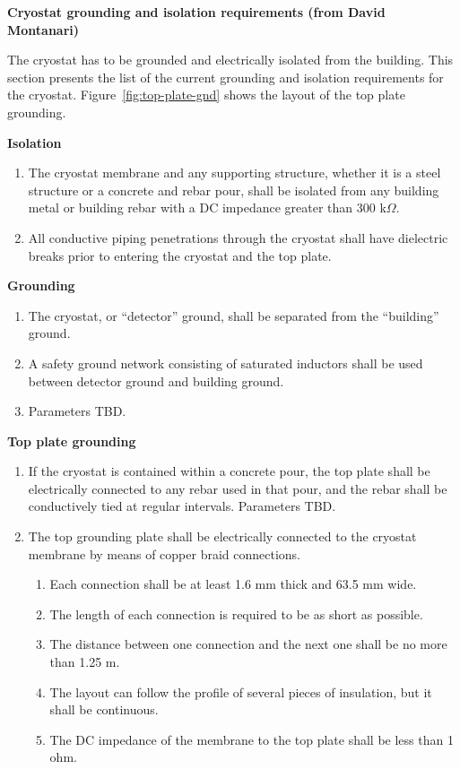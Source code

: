 \textbf{Cryostat grounding and isolation requirements (from David Montanari)}

The cryostat has to be grounded and electrically isolated from the building. %
This section presents the list of the current grounding and isolation requirements for the cryostat. 
Figure~\ref{fig:top-plate-gnd} shows the layout of the top plate grounding.

\textbf{Isolation}
\begin{enumerate}
\item The cryostat membrane and any supporting structure, whether it is a steel structure or a concrete and rebar pour, shall be isolated from any building metal or building rebar with a DC impedance greater than 300 k$\Omega$.
\item All conductive piping penetrations through the cryostat shall have dielectric breaks prior to entering the cryostat and the top plate.
\end{enumerate}

\textbf{Grounding}
\begin{enumerate}
\item The cryostat, or ``detector'' ground, shall be separated from the ``building'' ground.
\item A safety ground network consisting of saturated inductors shall be used between detector ground and building ground.
\item Parameters TBD.
\end{enumerate}

\textbf{Top plate grounding}
\begin{enumerate}
\item If the cryostat is contained within a concrete pour, the top plate shall be electrically connected to any rebar used in that pour, and the rebar shall be conductively tied at regular intervals. Parameters TBD.
\item The top grounding plate shall be electrically connected to the cryostat membrane by means of copper braid connections.
   \begin{enumerate}
   \item Each connection shall be at least 1.6 mm thick and 63.5 mm wide.
   \item The length of each connection is required to be as short as possible.
   \item The distance between one connection and the next one shall be no more than 1.25 m.
   \item The layout can follow the profile of several pieces of insulation, but it shall be continuous.
   \item The DC impedance of the membrane to the top plate shall be less than 1 ohm.
   \end{enumerate}
\end{enumerate}

